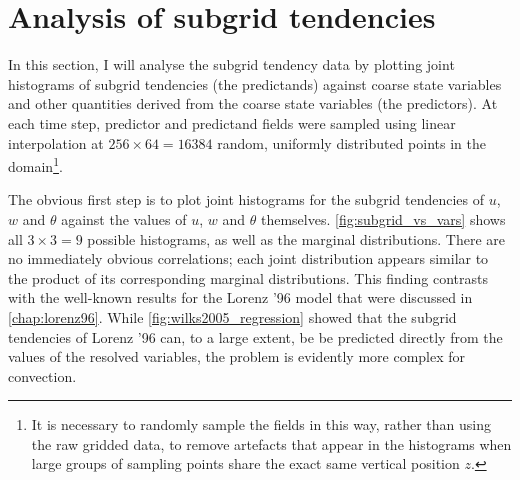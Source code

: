 \documentclass[../main.tex]{subfiles}
\begin{document}
\section{Analysis of subgrid tendencies} \label{sec:subgrid_analysis}
In this section, I will analyse the subgrid tendency data by plotting joint
histograms of subgrid tendencies (the predictands) against coarse state
variables and other quantities derived from the coarse state variables (the
predictors). At each time step, predictor and predictand fields were sampled
using linear interpolation at $256 \times 64 = 16384$ random, uniformly
distributed points in the domain\footnote{It is necessary to randomly sample
the fields in this way, rather than using the raw gridded data, to remove
artefacts that appear in the histograms when large groups of sampling points
share the exact same vertical position $z$.}.

The obvious first step is to plot joint histograms for the subgrid tendencies
of $u$, $w$ and $\theta$ against the values of $u$, $w$ and $\theta$
themselves. \cref{fig:subgrid_vs_vars} shows all $3 \times 3 = 9$ possible
histograms, as well as the marginal distributions. There are no immediately
obvious correlations; each joint distribution appears similar to the product of
its corresponding marginal distributions. This finding contrasts with the
well-known results for the Lorenz '96 model that were discussed in
\cref{chap:lorenz96}. While \cref{fig:wilks2005_regression} showed that
the subgrid tendencies of Lorenz '96 can, to a large extent, be be predicted
directly from the values of the resolved variables, the problem is evidently
more complex for \rb{} convection.
\end{document}

